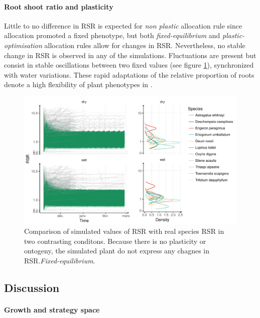 
\paragraph{Root shoot ratio and plasticity}

Little to no difference in RSR is expected for \textit{non plastic} allocation rule since allocation promoted a fixed phenotype, but both \textit{fixed-equilibrium} and \textit{plastic-optimisation} allocation rules allow for changes in RSR. Nevertheless, no stable change in RSR is observed in any of the simulations. Fluctuations are present but consist in stable oscillations between two fixed values (see figure \ref{fig:comparison_RSR}), synchronized with water variations. These rapid adaptations of the relative proportion of roots denote a high flexibility of plant phenotypes in \model.


\begin{figure}\label{fig:comparison_RSR}
\includegraphics[width = \textwidth]{./2_PP/Figures/Calibration/RSR_full_sim_f-e.pdf}
\caption{Comparison of simulated values of RSR with real species RSR in two contrasting conditons. Because there is no plasticity or ontogeny, the simulated plant do not express any chagnes in RSR.\textit{Fixed-equilibrium}.}
\end{figure}

\subsection{Discussion}

\paragraph{Growth and strategy space}

